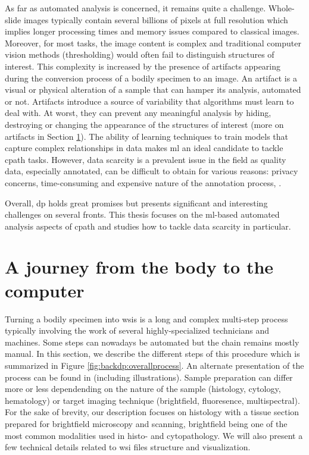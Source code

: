 As far as automated analysis is concerned, it remains quite a challenge. Whole-slide images typically contain several billions of pixels at full resolution which implies longer processing times and memory issues compared to classical images. Moreover, for most tasks, the image content is complex and traditional computer vision methods (\eg thresholding) would often fail to distinguish structures of interest. This complexity is increased by the presence of artifacts \cite{taqi2018review} appearing during the conversion process of a bodily specimen to an image. An artifact is a visual or physical alteration of a sample that can hamper its analysis, automated or not. Artifacts introduce a source of variability that algorithms must learn to deal with. At worst, they can prevent any meaningful analysis by hiding, destroying or changing the appearance of the structures of interest (more on artifacts in Section \ref{sec:backdp:wsi}). The ability of learning techniques to train models that capture complex relationships in data makes \acrlong{ml} an ideal candidate to tackle \acrlong{cpath} tasks. However, data scarcity is a prevalent issue in the field as quality data, especially annotated, can be difficult to obtain for various reasons: privacy concerns, time-consuming and expensive nature of the annotation process, \etc.     

Overall, \acrlong{dp} holds great promises but presents significant and interesting challenges on several fronts. This thesis focuses on the \acrshort{ml}-based automated analysis aspects of \acrlong{cpath} and studies how to tackle data scarcity in particular.

\section{A journey from the body to the computer}
\label{sec:backdp:wsi}

Turning a bodily specimen into \acrlong{wsi}s is a long and complex multi-step process typically involving the work of several highly-specialized technicians and machines. Some steps can nowadays be automated but the chain remains mostly manual. In this section, we describe the different steps of this procedure which is summarized in Figure \ref{fig:backdp:overallprocess}. An alternate presentation of the process can be found in \cite{mccann2014automated} (including illustrations). Sample preparation can differ more or less dependending on the nature of the sample (\eg histology, cytology, hematology) or target imaging technique (\eg brightfield, fluoresence, multispectral). For the sake of brevity, our description focuses on histology with a tissue section prepared for brightfield microscopy and scanning, brightfield being one of the most common modalities used in histo- and cytopathology. We will also present a few technical details related to \acrshort{wsi} files structure and visualization. 

